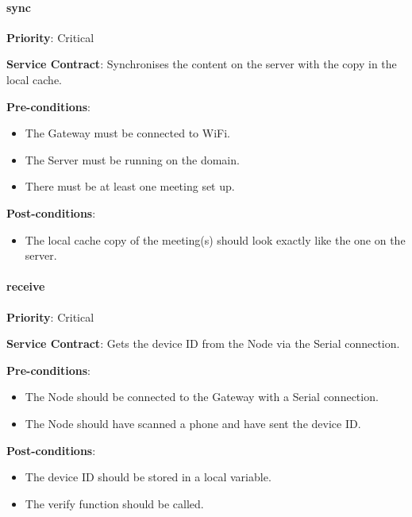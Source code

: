         \paragraph{sync}
			\begin{description}
			    \item{\textbf{Priority}:} Critical%
			    \item{\textbf{Service Contract}:} Synchronises the content on the server with the copy in the local cache.%
			    \item{\textbf{Pre-conditions}:}%
    			    \begin{itemize}
    			        \item The Gateway must be connected to WiFi.
    			        \item The Server must be running on the domain.
    			        \item There must be at least one meeting set up.
    			    \end{itemize}
			    \item{\textbf{Post-conditions}:} %
    			    \begin{itemize}
    			        \item The local cache copy of the meeting(s) should look exactly like the one on the server.
    			    \end{itemize}
			\end{description}
        
        \paragraph{receive}
			\begin{description}
			    \item{\textbf{Priority}:} Critical%
			    \item{\textbf{Service Contract}:} Gets the device ID from the Node via the Serial connection.%
			    \item{\textbf{Pre-conditions}:}%
    			    \begin{itemize}
    			        \item The Node should be connected to the Gateway with a Serial connection.
    			        \item The Node should have scanned a phone and have sent the device ID.
    			    \end{itemize}
			    \item{\textbf{Post-conditions}:} %
    			    \begin{itemize}
    			        \item The device ID should be stored in a local variable.
    			        \item The verify function should be called.
    			    \end{itemize}
			\end{description}
        

